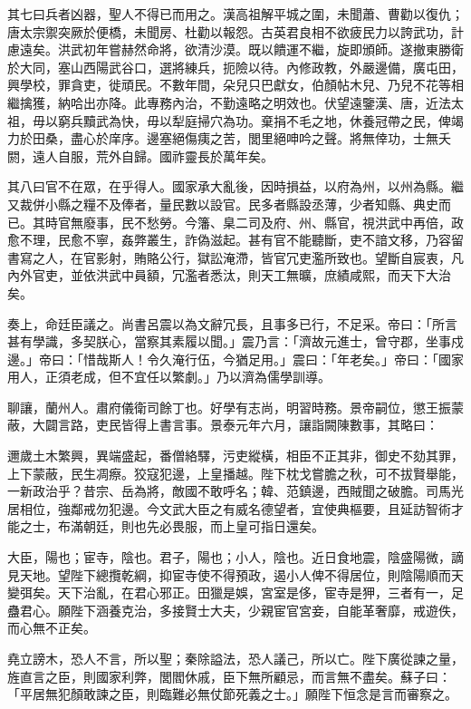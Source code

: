 \begin{pinyinscope}
其七曰兵者凶器，聖人不得已而用之。漢高祖解平城之圍，未聞蕭、曹勸以復仇；唐太宗禦突厥於便橋，未聞房、杜勸以報怨。古英君良相不欲疲民力以誇武功，計慮遠矣。洪武初年嘗赫然命將，欲清沙漠。既以饋運不繼，旋即頒師。遂撤東勝衛於大同，塞山西陽武谷口，選將練兵，扼險以待。內修政教，外嚴邊備，廣屯田，興學校，罪貪吏，徙頑民。不數年間，朵兒只巴獻女，伯顏帖木兒、乃兒不花等相繼擒獲，納哈出亦降。此專務內治，不勤遠略之明效也。伏望遠鑒漢、唐，近法太祖，毋以窮兵黷武為快，毋以犁庭掃穴為功。棄捐不毛之地，休養冠帶之民，俾竭力於田桑，盡心於庠序。邊塞絕傷痍之苦，閭里絕呻吟之聲。將無倖功，士無夭閼，遠人自服，荒外自歸。國祚靈長於萬年矣。

其八曰官不在眾，在乎得人。國家承大亂後，因時損益，以府為州，以州為縣。繼又裁併小縣之糧不及俸者，量民數以設官。民多者縣設丞薄，少者知縣、典史而已。其時官無廢事，民不愁勞。今籓、臬二司及府、州、縣官，視洪武中再倍，政愈不理，民愈不寧，姦弊叢生，詐偽滋起。甚有官不能聽斷，吏不諳文移，乃容留書寫之人，在官影射，賄賂公行，獄訟淹滯，皆官冗吏濫所致也。望斷自宸衷，凡內外官吏，並依洪武中員額，冗濫者悉汰，則天工無曠，庶績咸熙，而天下大治矣。

奏上，命廷臣議之。尚書呂震以為文辭冗長，且事多已行，不足采。帝曰：「所言甚有學識，多契朕心，當察其素履以聞。」震乃言：「濟故元進士，曾守郡，坐事戍邊。」帝曰：「惜哉斯人！令久淹行伍，今猶足用。」震曰：「年老矣。」帝曰：「國家用人，正須老成，但不宜任以繁劇。」乃以濟為儒學訓導。

聊讓，蘭州人。肅府儀衛司餘丁也。好學有志尚，明習時務。景帝嗣位，懲王振蒙蔽，大闢言路，吏民皆得上書言事。景泰元年六月，讓詣闕陳數事，其略曰：

邇歲土木繁興，異端盛起，番僧絡驛，污吏縱橫，相臣不正其非，御史不劾其罪，上下蒙蔽，民生凋瘵。狡寇犯邊，上皇播越。陛下枕戈嘗膽之秋，可不拔賢舉能，一新政治乎？昔宗、岳為將，敵國不敢呼名；韓、范鎮邊，西賊聞之破膽。司馬光居相位，強鄰戒勿犯邊。今文武大臣之有威名德望者，宜使典樞要，且延訪智術才能之士，布滿朝廷，則也先必畏服，而上皇可指日還矣。

大臣，陽也；宦寺，陰也。君子，陽也；小人，陰也。近日食地震，陰盛陽微，謫見天地。望陛下總攬乾綱，抑宦寺使不得預政，遏小人俾不得居位，則陰陽順而天變弭矣。天下治亂，在君心邪正。田獵是娛，宮室是侈，宦寺是狎，三者有一，足蠱君心。願陛下涵養克治，多接賢士大夫，少親宦官宮妾，自能革奢靡，戒遊佚，而心無不正矣。

堯立謗木，恐人不言，所以聖；秦除謚法，恐人議己，所以亡。陛下廣從諫之量，旌直言之臣，則國家利弊，閭閻休戚，臣下無所顧忌，而言無不盡矣。蘇子曰：「平居無犯顏敢諫之臣，則臨難必無仗節死義之士。」願陛下恒念是言而審察之。


\end{pinyinscope}
